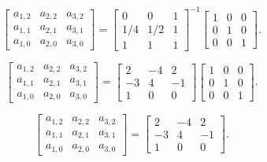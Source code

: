 \documentclass[10pt,b5paper,titlepage]{book}
\begin{document}
\begin{equation}
    \begin{bmatrix}
        a_{1,2} & a_{2,2} & a_{3,2} \\
        a_{1,1} & a_{2,1} & a_{3,1} \\
        a_{1,0} & a_{2,0} & a_{3,0}
    \end{bmatrix}
    =
    \begin{bmatrix}
        0 & 0 & 1 \\
        1 / 4 & 1 / 2 & 1 \\
        1 & 1 & 1
    \end{bmatrix}^{-1}
    \begin{bmatrix}
        1 & 0 & 0 \\
        0 & 1 & 0 \\
        0 & 0 & 1
    \end{bmatrix}
.\end{equation}

\begin{equation}
    \begin{bmatrix}
        a_{1,2} & a_{2,2} & a_{3,2} \\
        a_{1,1} & a_{2,1} & a_{3,1} \\
        a_{1,0} & a_{2,0} & a_{3,0}
    \end{bmatrix}
    =
    \begin{bmatrix}
        2 & -4 & 2 \\
        -3 & 4 & -1 \\
        1 & 0 & 0
    \end{bmatrix}
    \begin{bmatrix}
        1 & 0 & 0 \\
        0 & 1 & 0 \\
        0 & 0 & 1
    \end{bmatrix}
.\end{equation}

\begin{equation}
    \begin{bmatrix}
        a_{1,2} & a_{2,2} & a_{3,2} \\
        a_{1,1} & a_{2,1} & a_{3,1} \\
        a_{1,0} & a_{2,0} & a_{3,0}
    \end{bmatrix}
    =
    \begin{bmatrix}
        2 & -4 & 2 \\
        -3 & 4 & -1 \\
        1 & 0 & 0
    \end{bmatrix}
.\end{equation}
\end{document}
